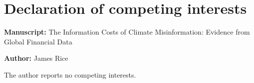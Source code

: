 \documentclass[12pt,a4paper]{article}
\begin{document}
\section*{Declaration of competing interests}
\noindent\textbf{Manuscript:} The Information Costs of Climate Misinformation: Evidence from Global Financial Data

\noindent\textbf{Author:} James Rice

The author reports no competing interests.
\end{document}
